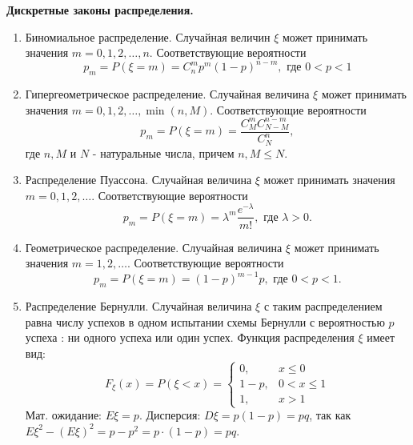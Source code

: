 \noindent \textbf{Дискретные законы распределения.}
\begin{enumerate}
	\item Биномиальное распределение. Случайная величин $\xi$ может принимать значения $m = 0,1,2,\dots,n$. Соответствующие вероятности
	\[ p_m = P(\xi = m) = C_n^m p^m (1-p)^{n-m}, \text{ где } 0 < p < 1 \]
	\item Гипергеометрическое распределение. Случайная величина $\xi$ может принимать значения $m = 0,1,2,\dots, \min (n, M)$. Соответствующие вероятности
	\[ p_m = P(\xi = m) = \frac{C_M^mC_{N-M}^{n-m}}{C_N^n}, \]
	где $n, M$ и $N$ - натуральные числа, причем $n, M \le N$.
	\item Распределение Пуассона. Случайная величина $\xi$ может принимать значения $m = 0,1,2,\dots$. Соответствующие вероятности
	\[ p_m = P(\xi = m) = \lambda^m \frac{e^{- \lambda}}{m!}, \text{ где } \lambda > 0. \]
	\item Геометрическое распределение. Случайная величина $\xi$ может принимать значения $m = 1,2,\dots$. Соответствующие вероятности
	\[ p_m = P(\xi = m) = (1 - p)^{m-1}p, \text{ где } 0 < p < 1. \]
	\item Распределение Бернулли. Случайная величина $\xi$ с таким распределением равна числу успехов в одном испытании схемы Бернулли с вероятностью $p$ успеха : ни одного успеха или один успех. Функция распределения $\xi$ имеет вид:
	\[
	F_{\xi} (x) = P (\xi < x) =
	\begin{cases}
		0, & x \le 0 \\
		1 - p, & 0 < x \le 1 \\
		1, & x > 1
	\end{cases}
	\]
	Мат. ожидание: $E\xi = p$. Дисперсия: $D\xi = p(1-p) = pq$, так как $E\xi^2 - (E\xi)^2 = p - p^2 = p \cdot (1-p) = pq$.
\end{enumerate}

